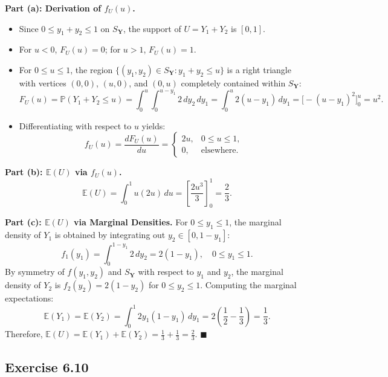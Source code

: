 \documentclass[11pt, letterpaper]{article}
\theoremstyle{definition}
\theoremstyle{remark}
\newcommand{\E}{\mathbb{E}}
\newcommand{\Prob}{\mathbb{P}}
\begin{document}
\textbf{Part (a): Derivation of $f_U(u)$.}
\begin{itemize}
    \item Since $0 \le y_1 + y_2 \le 1$ on $S_{\mathbf{Y}}$, the support of $U = Y_1 + Y_2$ is $[0, 1]$.
    \item For $u < 0$, $F_U(u) = 0$; for $u > 1$, $F_U(u) = 1$.
    \item For $0 \le u \le 1$, the region $\{(y_1, y_2) \in S_{\mathbf{Y}} : y_1 + y_2 \le u\}$ is a right triangle with vertices $(0,0)$, $(u,0)$, and $(0,u)$ completely contained within $S_{\mathbf{Y}}$:
    \[
        F_U(u) = \Prob(Y_1 + Y_2 \le u) = \int_{0}^{u} \int_{0}^{u - y_1} 2\,dy_2\,dy_1 = \int_{0}^{u} 2(u - y_1)\,dy_1 = \Big[ -(u - y_1)^2 \Big]_{0}^{u} = u^2.
    \]
    \item Differentiating with respect to $u$ yields:
    \[
        f_U(u) = \frac{dF_U(u)}{du} = \begin{cases} 2u, & 0 \le u \le 1, \\ 0, & \text{elsewhere.} \end{cases}
    \]
\end{itemize}

\textbf{Part (b): $\E(U)$ via $f_U(u)$.}
\[
    \E(U) = \int_{0}^{1} u(2u)\,du = \left[ \frac{2u^3}{3} \right]_{0}^{1} = \frac{2}{3}.
\]

\textbf{Part (c): $\E(U)$ via Marginal Densities.}
For $0 \le y_1 \le 1$, the marginal density of $Y_1$ is obtained by integrating out $y_2 \in [0, 1 - y_1]$:
\[
    f_1(y_1) = \int_{0}^{1 - y_1} 2\,dy_2 = 2(1 - y_1), \quad 0 \le y_1 \le 1.
\]
By symmetry of $f(y_1, y_2)$ and $S_{\mathbf{Y}}$ with respect to $y_1$ and $y_2$, the marginal density of $Y_2$ is $f_2(y_2) = 2(1 - y_2)$ for $0 \le y_2 \le 1$. Computing the marginal expectations:
\[
    \E(Y_1) = \E(Y_2) = \int_{0}^{1} 2y_1(1 - y_1)\,dy_1 = 2\left(\frac{1}{2} - \frac{1}{3}\right) = \frac{1}{3}.
\]
Therefore, $\E(U) = \E(Y_1) + \E(Y_2) = \frac{1}{3} + \frac{1}{3} = \frac{2}{3}$. \hfill $\blacksquare$

\subsection{Exercise 6.10}
\end{document}
